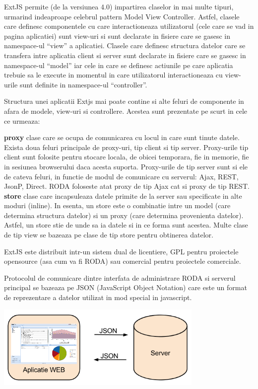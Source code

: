ExtJS permite (de la versiunea 4.0) impartirea claselor in mai multe tipuri, urmarind indeaproape celebrul pattern Model View Controller. Astfel, clasele care definesc componentele cu care interactioneaza utilizatorul (cele care se vad in pagina aplicatiei) sunt view-uri si sunt declarate in fisiere care se gasesc in namespace-ul “view” a aplicatiei. Clasele care definesc structura datelor care se transfera intre aplicatia client si server sunt declarate in fisiere care se gasesc in namespace-ul “model” iar cele in care se definesc actiunile pe care aplicatia trebuie sa le execute in momentul in care utilizatorul interactioneaza cu view-urile sunt definite in namespace-ul “controller”. 

Structura unei aplicatii Extjs mai poate contine si alte feluri de componente in afara de modele, view-uri si controllere. Acestea sunt prezentate pe scurt in cele ce urmeaza:

\textbf{proxy} clase care se ocupa de comunicarea cu locul in care sunt tinute datele. Exista doua feluri principale de proxy-uri, tip client si tip server. Proxy-urile tip client sunt folosite pentru stocare locala, de obicei temporara, fie in memorie, fie in sesiunea browserului daca acesta suporta. Proxy-urile de tip server sunt si ele de cateva feluri, in functie de modul de comunicare cu serverul: Ajax, REST, JsonP, Direct. RODA foloseste atat proxy de tip Ajax cat si proxy de tip REST. 
\textbf{store} clase care incapsuleaza datele primite de la server sau specificate in alte moduri (inline). In esenta, un store este o combinatie intre un model (care determina structura datelor) si un proxy (care determina provenienta datelor). Astfel, un store stie de unde sa ia datele si in ce forma sunt acestea. Multe clase de tip view se bazeaza pe clase de tip store pentru obtinerea datelor. 

ExtJS este distribuit intr-un sistem dual de licentiere, GPL pentru proiectele opensource (asa cum va fi RODA) sau comercial pentru proiectele comerciale. 

Protocolul de comunicare dintre interfata de administrare RODA si serverul principal se bazeaza pe JSON (JavaScript Object Notation) care este un format de reprezentare a datelor utilizat in mod special in javascript. 

\includegraphics[width=10cm]{img/json}

